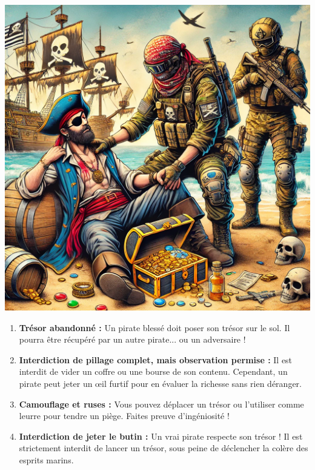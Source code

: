 \documentclass{pirategame}
\begin{document}
\begin{minipage}[t]{0.28\textwidth}
  \vspace{0em}
  \includegraphics[width=\linewidth]{img/rule-8.png}
\end{minipage}
\hfill
\begin{minipage}[t]{0.7\textwidth}
  \textwidth
  \begin{enumerate}[resume*=rules]
    \item \textbf{Trésor abandonné :} Un pirate blessé doit poser son trésor sur le sol. Il pourra être récupéré par un autre pirate... ou un adversaire !
    \item \textbf{Interdiction de pillage complet, mais observation permise :} Il est interdit de vider un coffre ou une bourse de son contenu. Cependant, un pirate peut jeter un œil furtif pour en évaluer la richesse sans rien déranger.
    \item \textbf{Camouflage et ruses :} Vous pouvez déplacer un trésor ou l'utiliser comme leurre pour tendre un piège. Faites preuve d'ingéniosité !
    \item \textbf{Interdiction de jeter le butin :} Un vrai pirate respecte son trésor ! Il est strictement interdit de lancer un trésor, sous peine de déclencher la colère des esprits marins.
  \end{enumerate}
\end{minipage}
\end{document}
